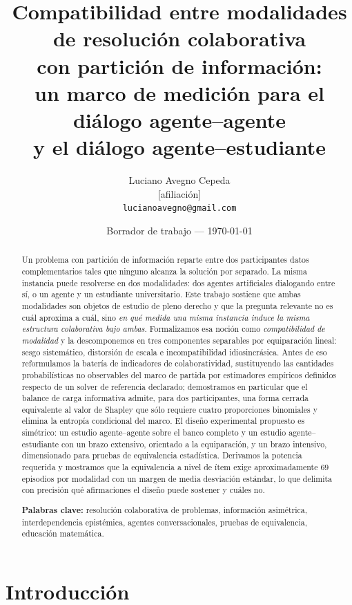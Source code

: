 \documentclass[11pt,a4paper]{article}
\title{\bf Compatibilidad entre modalidades de resolución colaborativa\\
  con partición de información:\\
  \large un marco de medición para el diálogo agente--agente\\
  y el diálogo agente--estudiante}
\author{Luciano Avegno Cepeda\\
  \small [afiliación]\\
  \small \texttt{lucianoavegno@gmail.com}}
\date{Borrador de trabajo --- \today}
\theoremstyle{definition}
\theoremstyle{plain}
\theoremstyle{remark}
\begin{document}
\maketitle

\begin{abstract}
\noindent
Un problema con partición de información reparte entre dos participantes datos
complementarios tales que ninguno alcanza la solución por separado. La misma
instancia puede resolverse en dos modalidades: dos agentes artificiales
dialogando entre sí, o un agente y un estudiante universitario. Este trabajo
sostiene que ambas modalidades son objetos de estudio de pleno derecho y que la
pregunta relevante no es cuál aproxima a cuál, sino \emph{en qué medida una misma
instancia induce la misma estructura colaborativa bajo ambas}. Formalizamos esa
noción como \emph{compatibilidad de modalidad} y la descomponemos en tres
componentes separables por equiparación lineal: sesgo sistemático, distorsión de
escala e incompatibilidad idiosincrásica. Antes de eso reformulamos la batería de
indicadores de colaboratividad, sustituyendo las cantidades probabilísticas no
observables del marco de partida por estimadores empíricos definidos respecto de
un solver de referencia declarado; demostramos en particular que el balance de
carga informativa admite, para dos participantes, una forma cerrada equivalente al
valor de Shapley que sólo requiere cuatro proporciones binomiales y elimina la
entropía condicional del marco. El diseño experimental propuesto es simétrico: un
estudio agente--agente sobre el banco completo y un estudio agente--estudiante con
un brazo extensivo, orientado a la equiparación, y un brazo intensivo,
dimensionado para pruebas de equivalencia estadística. Derivamos la potencia
requerida y mostramos que la equivalencia a nivel de ítem exige aproximadamente
$69$ episodios por modalidad con un margen de media desviación estándar, lo que
delimita con precisión qué afirmaciones el diseño puede sostener y cuáles no.

\vspace{0.6em}
\noindent\textbf{Palabras clave:} resolución colaborativa de problemas,
información asimétrica, interdependencia epistémica, agentes conversacionales,
pruebas de equivalencia, educación matemática.
\end{abstract}

\section{Introducción}
\end{document}
